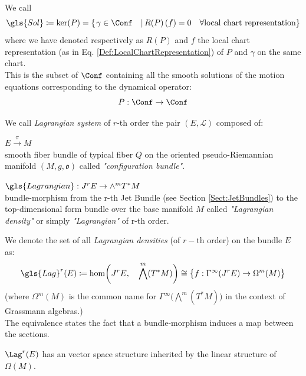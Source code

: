 \documentclass[a4paper,10pt]{report}
\begin{document}
	\begin{definition}\label{Def:SolSpace}
		We call
		\begin{displaymath}
			\gls{Sol} \coloneqq \ker(P) = \left\{\left. \gamma \in \Conf \quad\right\vert  R(P)\left(f\right) = 0 \quad \forall \textrm{local chart representation}\right\}
		\end{displaymath}
		where we have denoted respectively as $R(P)$ and $f$ the local chart representation (as in Eq. \ref{Def:LocalChartRepresentation}) of $P$ and $\gamma$ on the same chart.\\
		This is the subset of $\Conf$ containing all the smooth solutions of the motion equations corresponding to the  dynamical operator:
		\begin{displaymath}
			P: \Conf \rightarrow \Conf
		\end{displaymath}
	\end{definition}

	\begin{definition}
		We call \emph{Lagrangian system} of $r$-th order the
		pair $(E, \mathcal{L} )$ composed of:
		\begin{compactitemize}
			\item $E \xrightarrow{\pi} M$ \\smooth fiber bundle of typical fiber $Q$ on the oriented pseudo-Riemannian manifold $(M,g,\mathfrak{o})$ called \emph{"configuration bundle"}.
			\item	$ \gls{Lagrangian} : J^r E \rightarrow \wedge^m T^*M$ \\bundle-morphism from the r-th Jet Bundle (see Section \ref{Sect:JetBundles}) to  the top-dimensional form bundle over the base manifold $M$  called \emph{"Lagrangian density"} or simply \emph{"Lagrangian"} of r-th order.
		\end{compactitemize}
	\end{definition}

	\begin{definition}\label{Def:LagrangianDensities}
		We denote the set of all \emph{Lagrangian densities} (of $r-$th order) on the bundle $E$ as:
		\begin{displaymath}
			\gls{Lag}^r (E) \coloneqq \hom\biggr(J^r E,\quad \bigwedge^m( T^*M)\biggr)  \cong \big\{f:\Gamma^\infty(J^r E) \rightarrow \Omega^m(M)  \big\}
		\end{displaymath}
		(where $\Omega^m(M)$ is the common name for $\Gamma^\infty \big( \bigwedge^m( T^*M) \big)$ in the context of Grassmann algebras.)\\
		The equivalence states the fact that a bundle-morphism induces a map between the sections.
	\end{definition}
	\begin{proposition}
		$\Lag^r(E)$ has an vector space structure inherited by the linear structure of $\Omega(M)$.
	\end{proposition}
\end{document}
